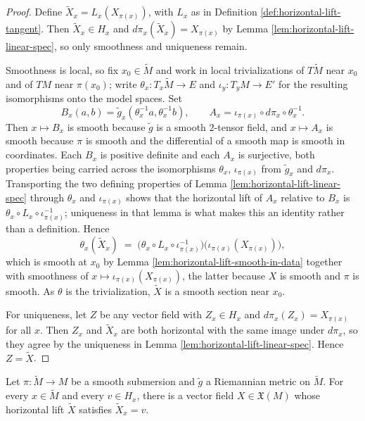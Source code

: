 \begin{proof}
\leanok
{}
Define $\tilde{X}_x = L_x(X_{\pi(x)})$, with $L_x$ as in Definition \ref{def:horizontal-lift-tangent}. Then $\tilde{X}_x \in H_x$ and $d\pi_x(\tilde{X}_x) = X_{\pi(x)}$ by Lemma \ref{lem:horizontal-lift-linear-spec}, so only smoothness and uniqueness remain.

Smoothness is local, so fix $x_0 \in \tilde{M}$ and work in local trivializations of $T\tilde{M}$ near $x_0$ and of $TM$ near $\pi(x_0)$; write $\theta_x : T_x\tilde{M} \to E$ and $\iota_y : T_yM \to E'$ for the resulting isomorphisms onto the model spaces. Set
\[
B_x(a,b) = \tilde{g}_x(\theta_x^{-1}a, \theta_x^{-1}b), \qquad A_x = \iota_{\pi(x)} \circ d\pi_x \circ \theta_x^{-1} .
\]
Then $x \mapsto B_x$ is smooth because $\tilde{g}$ is a smooth $2$-tensor field, and $x \mapsto A_x$ is smooth because $\pi$ is smooth and the differential of a smooth map is smooth in coordinates. Each $B_x$ is positive definite and each $A_x$ is surjective, both properties being carried across the isomorphisms $\theta_x$, $\iota_{\pi(x)}$ from $\tilde{g}_x$ and $d\pi_x$. Transporting the two defining properties of Lemma \ref{lem:horizontal-lift-linear-spec} through $\theta_x$ and $\iota_{\pi(x)}$ shows that the horizontal lift of $A_x$ relative to $B_x$ is $\theta_x \circ L_x \circ \iota_{\pi(x)}^{-1}$; uniqueness in that lemma is what makes this an identity rather than a definition. Hence
\[
\theta_x(\tilde{X}_x) \;=\; \bigl(\theta_x \circ L_x \circ \iota_{\pi(x)}^{-1}\bigr)\bigl(\iota_{\pi(x)}(X_{\pi(x)})\bigr),
\]
which is smooth at $x_0$ by Lemma \ref{lem:horizontal-lift-smooth-in-data} together with smoothness of $x \mapsto \iota_{\pi(x)}(X_{\pi(x)})$, the latter because $X$ is smooth and $\pi$ is smooth. As $\theta$ is the trivialization, $\tilde{X}$ is a smooth section near $x_0$.

For uniqueness, let $Z$ be any vector field with $Z_x \in H_x$ and $d\pi_x(Z_x) = X_{\pi(x)}$ for all $x$. Then $Z_x$ and $\tilde{X}_x$ are both horizontal with the same image under $d\pi_x$, so they agree by the uniqueness in Lemma \ref{lem:horizontal-lift-linear-spec}. Hence $Z = \tilde{X}$.
\end{proof}

\begin{proposition}
\label{prop:horizontal-lift-realizes-horizontal-vector}
\leanok
{}
Let $\pi : \tilde{M} \to M$ be a smooth submersion and $\tilde{g}$ a Riemannian metric on $\tilde{M}$. For every $x \in \tilde{M}$ and every $v \in H_x$, there is a vector field $X \in \mathfrak{X}(M)$ whose horizontal lift $\tilde{X}$ satisfies $\tilde{X}_x = v$.
\end{proposition}

